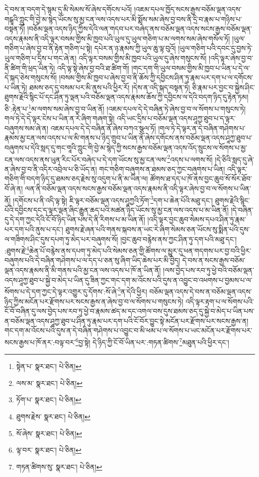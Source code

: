 དེ་བས་ན་བདག་དེ་སྙམ་དུ་མི་སེམས་སོ་ཞེས་དགོངས་པའོ། །འཇམ་དཔལ་ཁྱོད་སངས་རྒྱས་བཅོམ་ལྡན་འདས་གངྒཱའི་ཀླུང་གི་བྱེ་མ་སྙེད་ཡོངས་སུ་མྱ་ངན་ལས་འདས་པར་མི་སྨོས་སམ་ཞེས་བྱ་བས་ནི་དྲི་བ་རྣམ་པ་གཉིས་པ་བསྟན་ཏོ། །བཅོམ་ལྡན་འདས་ཉིད་ཀྱིས་དེའི་ལན་གདབ་པར་བཞེད་ནས་བཅོམ་ལྡན་འདས་སངས་རྒྱས་བཅོམ་ལྡན་འདས་རྣམས་ནི་འདི་ལྟར་བསམ་གྱིས་མི་ཁྱབ་པའི་ཡུལ་དུ་ཡུལ་གཅིག་པ་མ་ལགས་སམ་ཞེས་གསོལ་ཏོ། །ཡུལ་གཅིག་པ་ཞེས་བྱ་བ་ནི་རྟེན་གཅིག་པ་སྟེ། དཔེར་ན་ཉ་རྣམས་ཀྱི་ཡུལ་ཆུ་ལྟ་བུའོ། །ཡུལ་གཅིག་པའི་དབང་དུ་བྱས་ཏེ་ཡུལ་གཅིག་པ་དྲིས་པ་གང་ཞེ་ན། འདི་ལྟར་བསམ་གྱིས་མི་ཁྱབ་པའི་ཡུལ་དུ་ཞེས་གསུངས་སོ། །འདི་ལྟར་ཞེས་བྱ་བ་ནི་ཚིག་གི་ཕྲད་ཡིན་ཏེ། འདི་ལྟ་སྟེ་ཞེས་བྱ་བའི་ཐ་ཚིག་གོ། །གང་དག་གི་ཡུལ་བསམ་གྱིས་མི་ཁྱབ་པ་ཡིན་པ་དེ་ལ་དེ་སྐད་ཅེས་གསུངས་སོ། །བསམ་གྱིས་མི་ཁྱབ་པ་ཞེས་བྱ་བ་ནི་ཆོས་ཀྱི་དབྱིངས་ཤིན་ཏུ་རྣམ་པར་དག་པ་ལ་དགོངས་པ་ཡིན་ཏེ། ཐམས་ཅད་དུ་བསམ་པར་མི་ནུས་པའི་ཕྱིར་རོ། །དེས་ན་འདི་སྐད་བསྟན་ཏེ། ཅི་རྣམ་པར་བྱང་བ་སྐྱེས་ཤིང་ཐུགས་རྗེའི་སྙིང་པོ་དང་ཤིན་ཏུ་ལྡན་པའི་བཅོམ་ལྡན་འདས་རྣམས་ཆོས་ཀྱི་དབྱིངས་ལ་དེའི་བདག་ཉིད་དུ་རྟེན་ཏམ། ཅི་:རྟེན་པ་\footnote{སྟེན་པ་  སྣར་ཐང་།  པེ་ཅིན། }མ་ལགས་སམ་ཞེས་བྱ་བ་ཡིན་ནོ། །འཇམ་དཔལ་དེ་དེ་བཞིན་ཏེ་ཞེས་བྱ་བ་ལ་སོགས་པ་གསུངས་ཏེ། གལ་ཏེ་དེ་དེ་ལྟར་ངེས་པ་ཡིན་ན་རེ་ཞིག་གཞག་སྟེ། འདི་ཡང་དྲིས་པ་བཅོམ་ལྡན་འདས་ཤཱཀྱ་ཐུབ་པ་ད་ལྟར་བཞུགས་སམ་ཞེ་ན། འཇམ་དཔལ་དེ་དེ་བཞིན་ནོ་ཞེས་བཀའ་སྩལ་ཏོ། །གལ་ཏེ་དེ་ལྟར་ན་དེ་བཞིན་གཤེགས་པ་རྣམས་མྱ་ངན་ལས་འདས་པ་ལ་མི་གནས་པ་ཉིད་གྲུབ་པ་ཡིན་ནོ་ཞེས་དགོངས་ནས་བཅོམ་ལྡན་འདས་ཤཱཀྱ་ཐུབ་པ་བཞུགས་པ་དེའི་སླད་དུ་གང་གཱའི་ཀླུང་གི་བྱེ་མ་སྙེད་ཀྱི་སངས་རྒྱས་བཅོམ་ལྡན་འདས་འོད་སྲུངས་ལ་སོགས་པ་མྱ་ངན་ལས་འདས་ནས་ཡུན་རིང་པོར་བཞེད་པ་དེ་དག་ཡོངས་སུ་མྱ་ངན་ལས་\footnote{ལས་མ་  སྣར་ཐང་།  པེ་ཅིན། }འདས་པ་ལགས་སོ། །དེ་ཅིའི་སླད་དུ་ཞེ་ན་ཞེས་བྱ་བ་ནི་འདིར་འབྲེལ་པ་ཅི་ཡོད་ན། གང་གཅིག་བཞུགས་ན་ཐམས་ཅད་ཀྱང་བཞུགས་པ་ཡིན། འདི་ལྟར་གཅིག་གི་བདག་ཉིད་དུ་ཐམས་ཅད་རྗེས་སུ་འདུག་པ་ནི་མ་ཡིན་ལ། ཚོགས་ཐ་དད་པ་ཁོ་ནས་བྱང་ཆུབ་སོ་སོར་ཐོབ་བོ་ཞེ་ན། ལན་ནི་བཅོམ་ལྡན་འདས་སངས་རྒྱས་བཅོམ་ལྡན་འདས་རྣམས་ནི་འདི་ལྟར་ཞེས་བྱ་བ་ལ་སོགས་པ་ཡིན་ནོ། །དགོངས་པ་ནི་འདི་ལྟ་སྟེ། ཇི་ལྟར་བཅོམ་ལྡན་འདས་ཤཱཀྱའི་ཏོག་\footnote{ཏོག་པ་  སྣར་ཐང་།  པེ་ཅིན། }དག་པ་ཆེན་པོའི་མཐུ་དང་། ཐུགས་རྗེའི་སྙིང་པོའི་དབྱིངས་དང་ད་ལྟར་ལྡན་ཞིང་རྒྱུན་ཆད་པའི་མཚན་ཉིད་ཡོངས་སུ་མྱ་ངན་ལས་འདས་པ་མ་ཡིན་ནོ། །དེ་བཞིན་དུ་དེ་དག་ཀྱང་དེའི་ངོ་བོ་ཉིད་ཡིན་པས་དེ་ནི་རིགས་པ་མ་ཡིན་ནོ། །འདི་ལྟར་བྱང་ཆུབ་སེམས་དཔའ་ཤིན་ཏུ་རྣམ་པར་དག་པའི་ནུས་པ་དང་། ཐུགས་རྗེ་ཞན་པའི་གནས་སྐབས་ན་ཡང་རེ་ཞིག་སེམས་ཅན་ཡོངས་སུ་སྨིན་པའི་དུས་ལ་གཟིགས་ཤིང་དུས་དཔག་ཏུ་མེད་པར་བཞུགས་སོ། །བྱང་ཆུབ་བརྙེས་ནས་ཀྱང་ཤིན་ཏུ་དག་པའི་མཐུ་དང་། :ཐུགས་རྗེ་\footnote{ཐུགས་རྗེས་  སྣར་ཐང་།  པེ་ཅིན། }ཆེན་པོ་བརྙེས་ནས་དཔག་ཏུ་མེད་པའི་སེམས་ཅན་གྱི་ཚོགས་ལ་མྱུར་དུ་ཕན་གདགས་པར་བྱ་བའི་ཕྱིར་བཞུགས་པའི་དེ་བཞིན་གཤེགས་པ་ལ་དད་པ་ཅན་སུ་ཞིག་ཡིད་ཆེས་པར་མི་བྱེད། དེ་བས་ན་སངས་རྒྱས་བཅོམ་ལྡན་འདས་རྣམས་ནི་མི་གནས་པའི་མྱ་ངན་ལས་འདས་པ་ཁོ་ན་ཡིན་ནོ། །ལས་བྱེད་པས་རབ་ཏུ་ཕྱེ་བའི་བཅོམ་ལྡན་འདས་ཤཱཀྱ་ཐུབ་པ་སྐྱེ་བ་མེད་པ་ཡིན་དུ་ཟིན་ཀྱང་གང་དག་མ་འོངས་པའི་དུས་ན་འབྱུང་བ་འཕགས་པ་བྱམས་པ་ལ་སོགས་པ་དེ་དག་ཀྱང་དེ་ལྟར་འགྱུར་དུ་དོགས་:སོ་ཞེ་\footnote{སོ་ཞེས་  སྣར་ཐང་།  པེ་ཅིན། }ན་དེའི་ཕྱིར། བཅོམ་ལྡན་འདས་དེ་བས་ན་བཅོམ་ལྡན་འདས་ཉིད་ཀྱིས་མངོན་པར་རྫོགས་པར་སངས་རྒྱས་ན་ཞེས་བྱ་བ་ལ་སོགས་པ་གསུངས་ཏེ། འདི་ལྟར་རྟག་པ་ལ་སོགས་པའི་ངོ་བོ་བཞིན་དུ་ལས་བྱེད་པས་རབ་ཏུ་ཕྱེ་བ་རྣམས་ཚད་མ་དང་འགལ་བས་དུས་ཐམས་ཅད་དུ་སྐྱེ་བ་མེད་པ་ཡིན་པས་ན་བཅོམ་ལྡན་འདས་ཤཱཀྱ་ཐུབ་པ་ཤིན་ཏུ་རྣམ་པར་དག་པའི་ངོ་བོར་བྱུང་སྟེ་མངོན་པར་རྫོགས་པར་སངས་རྒྱས་ན། གང་དག་མ་འོངས་པའི་དུས་ན་དེ་བཞིན་གཤེགས་པ་འབྱུང་བ་མི་ཕམ་པ་ལ་སོགས་པ་ཡང་མངོན་པར་རྫོགས་པར་སངས་རྒྱས་པ་ཁོ་ནར་:བལྟ་བར་\footnote{ལྟ་བར་  སྣར་ཐང་།  པེ་ཅིན། }བྱ་སྟེ། དེ་ཉིད་ཀྱི་ངོ་བོ་ཡིན་པར་:གཏན་ཚིགས་\footnote{གཏན་ཚིགས་སུ་  སྣར་ཐང་།  པེ་ཅིན། }མཐུན་པའི་ཕྱིར་དང་། 